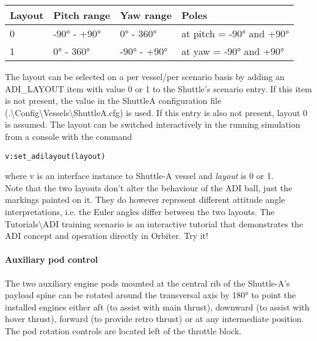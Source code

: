 \documentclass[Orbiter User Manual.tex]{subfiles}
\begin{document}
	\begin{longtable}{ |p{}|p{}|p{}|p{}| }
	\hline\rule{0pt}{2ex}
	\textbf{Layout} & \textbf{Pitch range} & \textbf{Yaw range} & \textbf{Poles}\\
	\hline\rule{0pt}{2ex}
	0 & -90° - +90° & 0° - 360° & at pitch = -90° and +90°\\
	\hline\rule{0pt}{2ex}
	1 & 0° - 360° & -90° - +90° & at yaw = -90° and +90°\\
	\hline
	\end{longtable}

\noindent
The layout can be selected on a per vessel/per scenario basis by adding an ADI\_LAYOUT item with value 0 or 1 to the Shuttle's scenario entry. If this item is not present, the value in the ShuttleA configuration file (.\textbackslash Config\textbackslash Vessels\textbackslash ShuttleA.cfg) is used. If this entry is also not present, layout 0 is assumed. The layout can be switched interactively in the running simulation from a console with the command

\begin{lstlisting}[language=OSFS]
v:set_adilayout(layout)
\end{lstlisting}

\noindent
where v is an interface instance to Shuttle-A vessel and \textit{layout} is 0 or 1.\\
Note that the two layouts don't alter the behaviour of the ADI ball, just the markings painted on it. They do however represent different attitude angle interpretations, i.e. the Euler angles differ between the two layouts.
The Tutorials\textbackslash ADI training scenario is an interactive tutorial that demonstrates the ADI concept and operation directly in Orbiter. Try it!


\paragraph{Auxiliary pod control}
\label{para:shuttlea_auxpod}
The two auxiliary engine pods mounted at the central rib of the Shuttle-A's payload spine can be rotated  around the transversal axis by 180° to point the installed engines either aft (to assist with main thrust), downward (to assist with hover thrust), forward (to provide retro thrust) or at any intermediate position. The pod rotation controls are located left of the throttle block.
\end{document}
